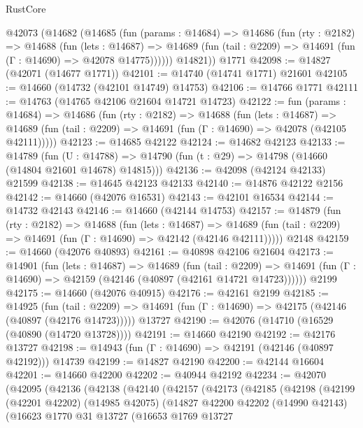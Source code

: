 \begin{lexlean}{RustCore}
\begin{coremodule}
    @42073
      (@14682
        (@14685
          (fun (params : @14684) =>
          @14686
            (fun (rty : @2182) =>
            @14688
              (fun (lets : @14687) =>
              @14689 (fun (tail : @2209) => @14691 (fun (Γ : @14690) => @42078 @14775))))))
        @14821))
    @1771
@42098 := @14827 (@42071 (@14677 @1771))
@42101 := @14740 (@14741 @1771) @21601
@42105 := @14660 (@14732 (@42101 @14749) @14753)
@42106 := @14766 @1771
@42111 := @14763 (@14765 @42106 @21604 @14721 @14723)
@42122 := fun (params : @14684) =>
  @14686
    (fun (rty : @2182) =>
    @14688
      (fun (lets : @14687) =>
      @14689 (fun (tail : @2209) => @14691 (fun (Γ : @14690) => @42078 (@42105 @42111)))))
@42123 := @14685 @42122
@42124 := @14682 @42123
@42133 := @14789
    (fun (U : @14788) => @14790 (fun (t : @29) => @14798 (@14660 (@14804 @21601 @14678) @14815)))
@42136 := @42098 (@42124 @42133) @21599
@42138 := @14645 @42123 @42133
@42140 := @14876 @42122 @2156
@42142 := @14660 (@42076 @16531)
@42143 := @42101 @16534
@42144 := @14732 @42143
@42146 := @14660 (@42144 @14753)
@42157 := @14879
    (fun (rty : @2182) =>
    @14688
      (fun (lets : @14687) =>
      @14689 (fun (tail : @2209) => @14691 (fun (Γ : @14690) => @42142 (@42146 @42111)))))
    @2148
@42159 := @14660 (@42076 @40893)
@42161 := @40898 @42106 @21604
@42173 := @14901
    (fun (lets : @14687) =>
    @14689
      (fun (tail : @2209) =>
      @14691 (fun (Γ : @14690) => @42159 (@42146 (@40897 (@42161 @14721 @14723))))))
    @2199
@42175 := @14660 (@42076 @40915)
@42176 := @42161 @2199
@42185 := @14925
    (fun (tail : @2209) => @14691 (fun (Γ : @14690) => @42175 (@42146 (@40897 (@42176 @14723)))))
    @13727
@42190 := @42076 (@14710 (@16529 (@40890 (@14720 @13728))))
@42191 := @14660 @42190
@42192 := @42176 @13727
@42198 := @14943 (fun (Γ : @14690) => @42191 (@42146 (@40897 @42192))) @14739
@42199 := @14827 @42190
@42200 := @42144 @16604
@42201 := @14660 @42200
@42202 := @40944 @42192
@42234 := @42070
    (@42095
      (@42136
        (@42138
          (@42140
            (@42157
              (@42173
                (@42185
                  (@42198
                    (@42199
                      (@42201 @42202)
                      (@14985 @42075)
                      (@14827
                        @42200
                        @42202
                        (@14990 @42143)
                        (@16623
                          @1770
                          @31
                          @13727
                          (@16653
                            @1769
                            @13727

\end{coremodule}
\end{lexlean}
